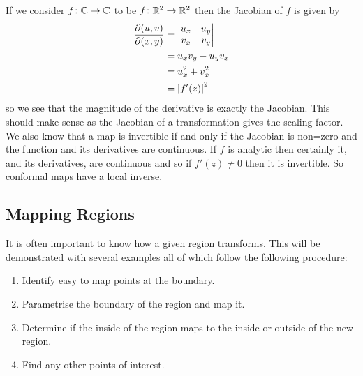 \documentclass{article}
\begin{document}
    If we consider \(f\colon\mathbb{C}\to\mathbb{C}\) to be \(f\colon\mathbb{R}^2\to\mathbb{R}^2\) then the Jacobian of \(f\) is given by
    \begin{align*}
        \pdv{(u, v)}{(x, y)} &=
        \begin{vmatrix}
            u_x & u_y\\
            v_x & v_y
        \end{vmatrix}
        \\
        &= u_xv_y - u_yv_x\\
        &= u_x^2 + v_x^2\\
        &= \abs{f'(z)}^2
    \end{align*}
    so we see that the magnitude of the derivative is exactly the Jacobian.
    This should make sense as the Jacobian of a transformation gives the scaling factor.
    We also know that a map is invertible if and only if the Jacobian is non=zero and the function and its derivatives are continuous.
    If \(f\) is analytic then certainly it, and its derivatives, are continuous and so if \(f'(z) \ne 0\) then it is invertible.
    So conformal maps have a local inverse.
    
    \subsection{Mapping Regions}
    It is often important to know how a given region transforms.
    This will be demonstrated with several examples all of which follow the following procedure:
    \begin{enumerate}
        \item Identify easy to map points at the boundary.
        \item Parametrise the boundary of the region and map it.
        \item Determine if the inside of the region maps to the inside or outside of the new region.
        \item Find any other points of interest.
    \end{enumerate}
\end{document}
